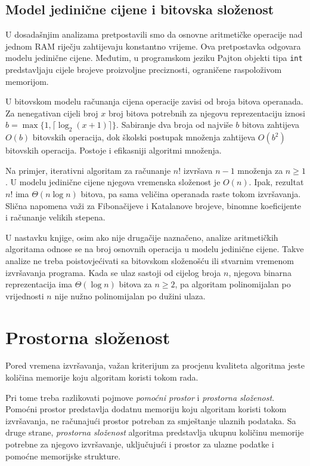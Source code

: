 \subsection{Model jedinične cijene i bitovska složenost}

U dosadašnjim analizama pretpostavili smo da osnovne aritmetičke operacije nad jednom RAM riječju zahtijevaju konstantno vrijeme. Ova pretpostavka odgovara modelu jedinične cijene. Međutim, u programskom jeziku Pajton objekti tipa \texttt{int} predstavljaju cijele brojeve proizvoljne preciznosti, ograničene raspoloživom memorijom.

U bitovskom modelu računanja cijena operacije zavisi od broja bitova operanada. Za nenegativan cijeli broj $x$ broj bitova potrebnih za njegovu reprezentaciju iznosi $b=\max\{1,\lceil\log_2(x+1)\rceil\}$. Sabiranje dva broja od najviše $b$ bitova zahtijeva $O(b)$ bitovskih operacija, dok školski postupak množenja zahtijeva $O(b^2)$ bitovskih operacija. Postoje i efikasniji algoritmi množenja.

Na primjer, iterativni algoritam za računanje $n!$ izvršava $n-1$ množenja za $n\geq 1$. U modelu jedinične cijene njegova vremenska složenost je $O(n)$. Ipak, rezultat $n!$ ima $\Theta(n\log n)$ bitova, pa sama veličina operanada raste tokom izvršavanja. Slična napomena važi za Fibonačijeve i Katalanove brojeve, binomne koeficijente i računanje velikih stepena.

U nastavku knjige, osim ako nije drugačije naznačeno, analize aritmetičkih algoritama odnose se na broj osnovnih operacija u modelu jedinične cijene. Takve analize ne treba poistovjećivati sa bitovskom složenošću ili stvarnim vremenom izvršavanja programa. Kada se ulaz sastoji od cijelog broja $n$, njegova binarna reprezentacija ima $\Theta(\log n)$ bitova za $n\geq 2$, pa algoritam polinomijalan po vrijednosti $n$ nije nužno polinomijalan po dužini ulaza.

\section{Prostorna složenost}

Pored vremena izvršavanja, važan kriterijum za procjenu kvaliteta algoritma jeste količina memorije koju algoritam koristi tokom rada.

Pri tome treba razlikovati pojmove \textit{pomoćni prostor} i \textit{prostorna složenost}. Pomoćni prostor predstavlja dodatnu memoriju koju algoritam koristi tokom izvršavanja, ne računajući prostor potreban za smještanje ulaznih podataka.  Sa druge strane, \textit{prostorna složenost} algoritma predstavlja ukupnu količinu memorije potrebne za njegovo izvršavanje, uključujući i prostor za ulazne podatke i pomoćne memorijske strukture.

